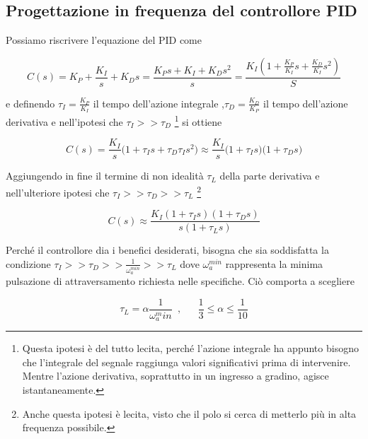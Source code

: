 \documentclass[english]{article}
\newcommand{\trippleSpacing}{\phantom{aaa}}	%
\newcommand{\singleSpacing}{\phantom{a}}	%
\begin{document}
	
	\subsection{Progettazione in frequenza del controllore PID}
	\label{sub:ProgettazionePID}
	
		Possiamo riscrivere l'equazione del PID come
		
		\begin{equation}
			C(s)=K_P + \frac{K_I}{s} + K_Ds=\frac{K_Ps+K_I+K_Ds^2}{s}=\frac{K_I(1+\frac{K_P}{K_I}s+\frac{K_D}{K_I}s^2)}{S}
			\label{eq:PIDriscritto}
		\end{equation}
		
		\noindent e definendo $\tau_I=\frac{K_P}{K_I}$ il tempo dell'azione integrale ,$\tau_D=\frac{K_D}{K_P}$ il tempo dell'azione derivativa e nell'ipotesi che $\tau_I>>\tau_D$ \footnote{Questa ipotesi è del tutto lecita, perché l'azione integrale ha appunto bisogno che l'integrale del segnale raggiunga valori significativi prima di intervenire. Mentre l'azione derivativa, soprattutto in un ingresso a gradino, agisce istantaneamente.} si ottiene 
		
		\begin{equation}
			C(s)=\frac{K_I}{s}\bigl(1+\tau_Is+\tau_D\tau_Is^2\bigl) \approx \frac{K_I}{s}\bigl(1+\tau_Is\bigl)\bigl(1+\tau_Ds\bigl)
			\label{eq:PIDtau}
		\end{equation}
		
		\noindent Aggiungendo in fine il termine di non idealità $\tau_L$ della parte derivativa e nell'ulteriore ipotesi che $\tau_I>>\tau_D>>\tau_L$ \footnote{Anche questa ipotesi è lecita, visto che il polo si cerca di metterlo più in alta frequenza possibile.}
		
		\begin{equation}
			C(s) \approx \frac{K_I(1+\tau_Is)(1+\tau_Ds)}{s(1+\tau_Ls)}
			\label{eq:PIDfinale}
		\end{equation}
	
		\noindent Perché il controllore dia i benefici desiderati, bisogna che sia soddisfatta la condizione $\tau_I>>\tau_D>>\frac{1}{\omega_a^{min}}>>\tau_L$ dove $\omega_a^{min}$ rappresenta la minima pulsazione di attraversamento richiesta nelle specifiche. Ciò comporta a scegliere
		
		\begin{equation}
			\tau_L=\alpha\frac{1}{\omega_a^min} \singleSpacing, \trippleSpacing \frac{1}{3}\le\alpha\le\frac{1}{10}
			\label{eq:tauL}
		\end{equation}
		
\end{document}
